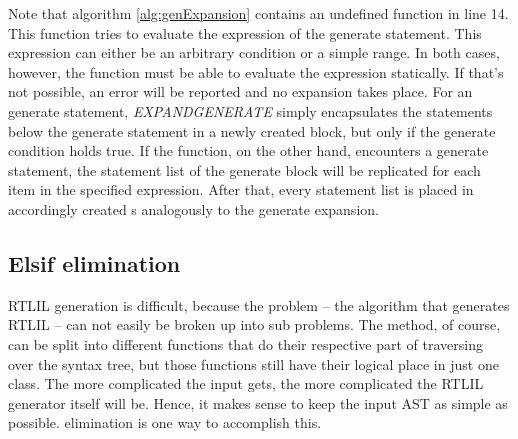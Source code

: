 Note that algorithm \ref{alg:genExpansion} contains an undefined
function in line 14. This function tries to evaluate the expression of
the generate statement. This expression can either be an arbitrary
condition or a simple range. In both cases, however, the function must
be able to evaluate the expression statically. If that's not possible,
an error will be reported and no expansion takes place. For an 
generate statement, \emph{EXPANDGENERATE} simply encapsulates the
statements below the generate statement in a newly created block, but
only if the generate condition holds true. If the function, on the
other hand,
encounters a  generate statement, the statement list of the
generate block will be replicated for each item in the specified
expression. After that, every statement list is placed in accordingly
created s analogously to the  generate expansion.

\subsection{Elsif elimination}
\label{sec:ElsifElimination}

RTLIL generation is difficult, because the problem -- the algorithm
that generates RTLIL -- can not easily be broken up into sub
problems. The method, of course, can be split into different functions
that do their respective part of traversing over the syntax tree, but
those functions still have their logical place in just one
class. The
more complicated the input gets, the more
complicated the RTLIL generator itself will be.
Hence, it makes sense to keep the input AST as simple as
possible.  elimination is one way to accomplish this.

